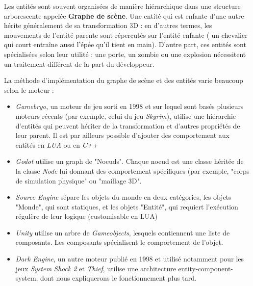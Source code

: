     Les entités sont souvent organisées de manière hiérarchique dans une structure arborescente appelée \textbf{Graphe de scène}. Une entité qui est enfante d'une autre hérite généralement de sa transformation 3D : en d'autres termes, les mouvements de l'entité parente sont répercutés sur l'entité enfante ( un chevalier qui court entraîne aussi l'épée qu'il tient en main). D'autre part, ces entités sont spécialisées selon leur utilité : une porte, un zombie ou une explosion nécessitent un traitement différent de la part du développeur.
    
    La méthode d'implémentation du graphe de scène et des entités varie beaucoup selon le moteur :

\begin{itemize}
    \item \textit{Gamebryo}, un moteur de jeu sorti en 1998 et sur lequel sont basés plusieurs moteurs récents (par exemple, celui du jeu \textit{Skyrim}), utilise une hiérarchie d'entités qui peuvent hériter de la transformation et d'autres propriétés de leur parent. Il est par ailleurs possible d'ajouter des comportement aux entités en \textit{LUA} ou en \textit{C++}
    \item \textit{Godot} utilise un graph de "Noeuds". Chaque noeud est une classe héritée de la classe \textit{Node} lui donnant des comportement spécifiques (par exemple, "corps de simulation physique" ou "maillage 3D".
    \item \textit{Source Engine} sépare les objets du monde en deux catégories, les objets "Monde", qui sont statiques, et les objets "Entité", qui requiert l'exécution régulère de leur logique (customisable en LUA)
    \item \textit{Unity} utilise un arbre de \textit{Gameobjects}, lesquels contiennent une liste de composants. Les composants spécialisent le comportement de l'objet.
    \item \textit{Dark Engine}, un autre moteur publié en 1998 et utilisé notamment pour les jeux \textit{System Shock 2} et \textit{Thief}, utilise une architecture entity-component-system, dont nous expliquerons le fonctionnement plus tard.
\end{itemize}

